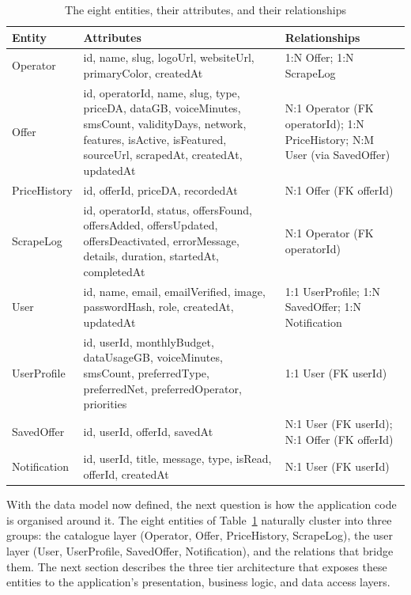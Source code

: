 \begin{table}[H]
  \caption{The eight entities, their attributes, and their relationships}
  \label{tab:entities}
  \centering\small
  \begin{tabular}{|p{2.2cm}|p{8.3cm}|p{3.6cm}|}
    \hline
    \textbf{Entity} & \textbf{Attributes} & \textbf{Relationships} \\
    \hline
    Operator     & id, name, slug, logoUrl, websiteUrl, primaryColor, createdAt & 1:N Offer; 1:N ScrapeLog \\
    \hline
    Offer        & id, operatorId, name, slug, type, priceDA, dataGB, voiceMinutes, smsCount, validityDays, network, features, isActive, isFeatured, sourceUrl, scrapedAt, createdAt, updatedAt & N:1 Operator (FK operatorId); 1:N PriceHistory; N:M User (via SavedOffer) \\
    \hline
    PriceHistory & id, offerId, priceDA, recordedAt & N:1 Offer (FK offerId) \\
    \hline
    ScrapeLog    & id, operatorId, status, offersFound, offersAdded, offersUpdated, offersDeactivated, errorMessage, details, duration, startedAt, completedAt & N:1 Operator (FK operatorId) \\
    \hline
    User         & id, name, email, emailVerified, image, passwordHash, role, createdAt, updatedAt & 1:1 UserProfile; 1:N SavedOffer; 1:N Notification \\
    \hline
    UserProfile  & id, userId, monthlyBudget, dataUsageGB, voiceMinutes, smsCount, preferredType, preferredNet, preferredOperator, priorities & 1:1 User (FK userId) \\
    \hline
    SavedOffer   & id, userId, offerId, savedAt & N:1 User (FK userId); N:1 Offer (FK offerId) \\
    \hline
    Notification & id, userId, title, message, type, isRead, offerId, createdAt & N:1 User (FK userId) \\
    \hline
  \end{tabular}
\end{table}

With the data model now defined, the next question is how the application code is organised around it. The eight entities of Table~\ref{tab:entities} naturally cluster into three groups: the catalogue layer (Operator, Offer, PriceHistory, ScrapeLog), the user layer (User, UserProfile, SavedOffer, Notification), and the relations that bridge them. The next section describes the three tier architecture that exposes these entities to the application's presentation, business logic, and data access layers.

